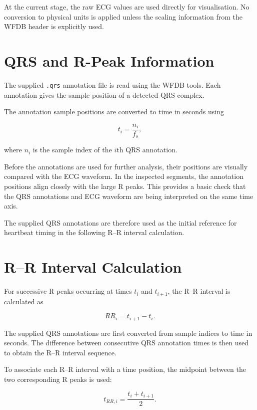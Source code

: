 \documentclass[a4paper,10.5pt,oneside]{report}
\begin{document}
At the current stage, the raw ECG values are used directly for visualisation.
No conversion to physical units is applied unless the scaling information from
the WFDB header is explicitly used.

\section{QRS and R-Peak Information}

The supplied \texttt{.qrs} annotation file is read using the WFDB tools. Each
annotation gives the sample position of a detected QRS complex.

The annotation sample positions are converted to time in seconds using

\begin{equation}
t_i = \frac{n_i}{f_s},
\end{equation}

where $n_i$ is the sample index of the $i$th QRS annotation.

Before the annotations are used for further analysis, their positions are
visually compared with the ECG waveform. In the inspected segments, the
annotation positions align closely with the large R peaks. This provides a
basic check that the QRS annotations and ECG waveform are being interpreted on
the same time axis.

The supplied QRS annotations are therefore used as the initial reference for
heartbeat timing in the following R--R interval calculation.

\section{R--R Interval Calculation}

For successive R peaks occurring at times $t_i$ and $t_{i+1}$, the R--R
interval is calculated as

\begin{equation}
RR_i = t_{i+1}-t_i.
\end{equation}

The supplied QRS annotations are first converted from sample indices to time in
seconds. The difference between consecutive QRS annotation times is then used
to obtain the R--R interval sequence.

To associate each R--R interval with a time position, the midpoint between the
two corresponding R peaks is used:

\begin{equation}
t_{RR,i} = \frac{t_i+t_{i+1}}{2}.
\end{equation}
\end{document}
